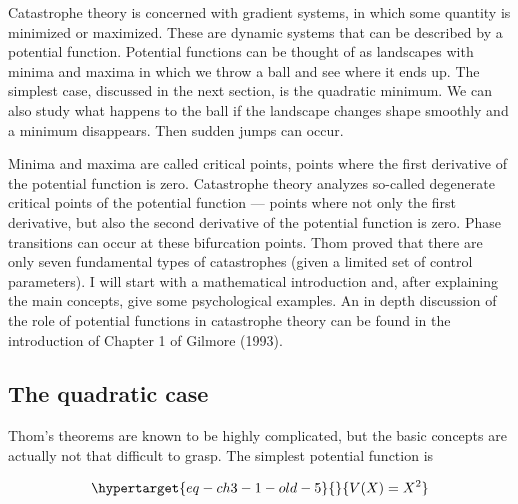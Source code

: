 \documentclass[
  a4paper,
  DIV=11,
  numbers=noendperiod]{scrreprt}
\begin{document}
Catastrophe theory is concerned with gradient systems, in which some
quantity is minimized or maximized. These are dynamic systems that can
be described by a potential function. Potential functions can be thought
of as landscapes with minima and maxima in which we throw a ball and see
where it ends up. The simplest case, discussed in the next section, is
the quadratic minimum. We can also study what happens to the ball if the
landscape changes shape smoothly and a minimum disappears. Then sudden
jumps can occur.

Minima and maxima are called critical points, points where the first
derivative of the potential function is zero. Catastrophe theory
analyzes so-called degenerate critical points of the potential function
--- points where not only the first derivative, but also the second
derivative of the potential function is zero. Phase transitions can
occur at these bifurcation points. Thom proved that there are only seven
fundamental types of catastrophes (given a limited set of control
parameters). I will start with a mathematical introduction and, after
explaining the main concepts, give some psychological examples. An in
depth discussion of the role of potential functions in catastrophe
theory can be found in the introduction of Chapter 1 of Gilmore (1993).

\hypertarget{sec-The-quadratic-case}{%
\subsection{The quadratic case}\label{sec-The-quadratic-case}}

Thom's theorems are known to be highly complicated, but the basic
concepts are actually not that difficult to grasp. The simplest
potential function is

\begin{equation}\protect\hypertarget{eq-ch3-1-old-5}{}{
V(X) = X^{2}
}\label{eq-ch3-1-old-5}\end{equation}
\end{document}
